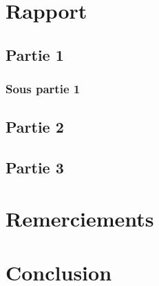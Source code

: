 \documentclass[12pt, openany]{article}
\begin{document}
\section{Rapport}
\subsection{Partie 1}
\subsubsection{Sous partie 1}
\subsection{Partie 2}
\subsection{Partie 3}
\section{Remerciements}
\section{Conclusion}
\end{document}
